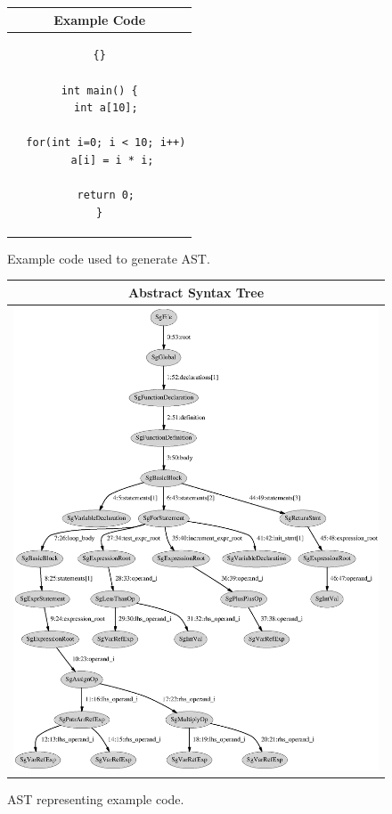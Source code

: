 \documentclass[10pt]{article}
\begin{document}
\begin{figure}[tb]
\begin{center}
\begin{tabular}{|c|} \hline
 Example Code \\\hline\hline
\begin{lstlisting}{}

int main() {
  int a[10];

  for(int i=0; i < 10; i++)
    a[i] = i * i;

  return 0;
}

\end{lstlisting}
\\\hline
\end{tabular}
\end{center}
\caption{ Example code used to generate AST. }
\label{AST_Code}
\end{figure}

\begin{figure}[tbh]
\begin{center}
\begin{tabular}{|c|} \hline
 Abstract Syntax Tree \\\hline\hline
\includegraphics[scale=0.9]{AST.ps}
\\\hline
\end{tabular}
\end{center}
\caption{AST representing example code. }
\label{AST_Graph}
\end{figure}
\end{document}
